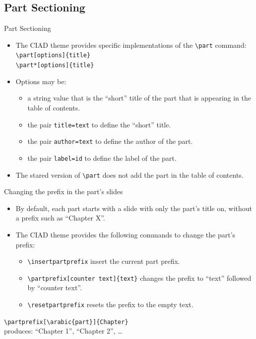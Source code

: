 \documentclass[english,sectioncirclenumberstyle]{ciadbeamer}
\begin{document}
\subsection{Part Sectioning}

\begin{frame}{Part Sectioning}
	\begin{itemize}
	\item The CIAD theme provides specific implementations of the \texttt{{\textbackslash}part} command: \\
		\texttt{{\textbackslash}part[options]\{title\}} \\
		\texttt{{\textbackslash}part*[options]\{title\}}
	\vfill
	\item Options may be: \begin{itemize}
		\item a string value that is the ``short'' title of the part that is appearing in the table of contents.
		\item the pair \texttt{title=text} to define the ``short'' title.
		\item the pair \texttt{author=text} to define the author of the part.
		\item the pair \texttt{label=id} to define the label of the part.
		\end{itemize}
	\vfill
	\item The stared version of \texttt{{\textbackslash}part} does not add the part in the table of contents.
	\end{itemize}
\end{frame}

\begin{frame}{{Changing the prefix} in the part's slides}
	\begin{itemize}
	\item By default, each part starts with a slide with only the part's title on, without a prefix such as ``Chapter X''.
	\vfill
	\item The CIAD theme provides the following commands to change the part's prefix:
		\begin{itemize}
		\item \texttt{{\textbackslash}insertpartprefix} insert the current part prefix.
		\item \texttt{{\textbackslash}partprefix[counter text]\{text\}} changes the prefix to ``text'' followed by ``counter text''.
		\item \texttt{{\textbackslash}resetpartprefix} resets the prefix to the empty text.
		\end{itemize}
	\end{itemize}
	\vfill
	\begin{example}
		\texttt{{\textbackslash}partprefix[{\textbackslash}arabic\{part\}]\{Chapter\}} \\
		produces: ``Chapter 1'', ``Chapter 2'', \dots
	\end{example}
\end{frame}
\end{document}

